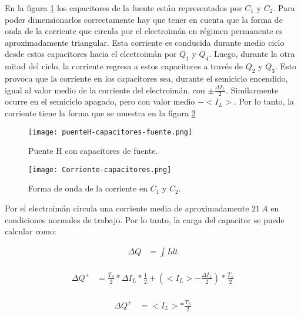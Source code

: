 \noindent En la figura \ref{fig:img_puenteH-capacitores-fuente.png} los capacitores de la fuente están representados por $C_1$ y $C_2$. Para poder dimensionarlos correctamente hay que tener en cuenta que la forma de onda de la corriente que circula por el electroimán en régimen permanente es aproximadamente triangular. Esta corriente es conducida durante medio ciclo desde estos capacitores hacia el electroimán por $Q_1$ y $Q_4$. Luego, durante la otra mitad del ciclo, la corriente regresa a estos capacitores a través de $Q_2$ y $Q_3$. Esto provoca que la corriente en los capacitores sea, durante el semiciclo encendido, igual al valor medio de la corriente del electroimán, con $ \pm \frac{\Delta I_L}{2}$. Similarmente ocurre en el semiciclo apagado, pero con valor medio $-<I_L>$.  Por lo tanto,  la corriente tiene la forma que se muestra en la figura \ref{fig:img_ccorriente-capacitores}

\begin{figure}[H]
	\centering
	\texttt{[image: puenteH-capacitores-fuente.png]}
	\caption{Puente H con capacitores de fuente.}
	\label{fig:img_puenteH-capacitores-fuente.png}
\end{figure}

\begin{figure}[H]
	\centering
	\texttt{[image: Corriente-capacitores.png]}
	\caption{Forma de onda de la corriente en $C_1$ y $C_2$.}
	\label{fig:img_ccorriente-capacitores}
\end{figure}

\noindent Por el electroimán circula una corriente media de aproximadamente $21\:A$ en condiciones normales de trabajo. Por lo tanto, la carga del capacitor se puede calcular como:

\begin{equation} 
	\begin{aligned}
		\Delta Q &= \int I dt\\	
	\end{aligned}
\end{equation}

\begin{equation} 
	\begin{aligned}
		\Delta Q ^+ &= \frac{T_S}{2}*\Delta I_L * \frac{1}{2} + (<I_L> -\frac{\Delta I_L}{2})*\frac{T_S}{2}\\
	\end{aligned}
\end{equation}

\begin{equation} 
	\begin{aligned}
		\Delta Q ^+ &= <I_L> *\frac{T_S}{2}\\
	\end{aligned}
\end{equation}

